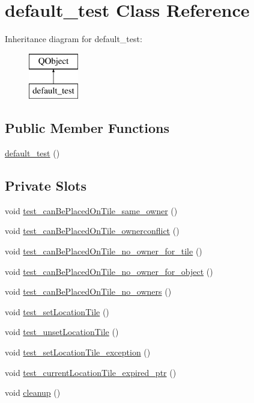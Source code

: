 \hypertarget{classdefault__test}{\section{default\-\_\-test Class Reference}
\label{classdefault__test}
}
Inheritance diagram for default\-\_\-test\-:\begin{figure}[H]
\begin{center}
\leavevmode
\includegraphics[height=2.000000cm]{classdefault__test}
\end{center}
\end{figure}
\subsection*{Public Member Functions}
\begin{DoxyCompactItemize}
\item 
\hyperlink{classdefault__test_adc43e1333543986f2b1cea153e55e64e}{default\-\_\-test} ()
\end{DoxyCompactItemize}
\subsection*{Private Slots}
\begin{DoxyCompactItemize}
\item 
void \hyperlink{classdefault__test_a4529264e0eb70a16261b0005a28185b8}{test\-\_\-can\-Be\-Placed\-On\-Tile\-\_\-same\-\_\-owner} ()
\item 
void \hyperlink{classdefault__test_a936c70b0c81a6d5e6fb3ffe1e9a49f57}{test\-\_\-can\-Be\-Placed\-On\-Tile\-\_\-ownerconflict} ()
\item 
void \hyperlink{classdefault__test_a9f9d88002d8b2dfd225718c1bce068c7}{test\-\_\-can\-Be\-Placed\-On\-Tile\-\_\-no\-\_\-owner\-\_\-for\-\_\-tile} ()
\item 
void \hyperlink{classdefault__test_a82123bc8fb9c4bb9d082f7d625de5770}{test\-\_\-can\-Be\-Placed\-On\-Tile\-\_\-no\-\_\-owner\-\_\-for\-\_\-object} ()
\item 
void \hyperlink{classdefault__test_a680f90cfb91c58a2008d0f8c29bda1c6}{test\-\_\-can\-Be\-Placed\-On\-Tile\-\_\-no\-\_\-owners} ()
\item 
void \hyperlink{classdefault__test_ace1145c8d8200edbdf7cdcff67c4a114}{test\-\_\-set\-Location\-Tile} ()
\item 
void \hyperlink{classdefault__test_a0efdf82443ef2b7419f77f888f35e09c}{test\-\_\-unset\-Location\-Tile} ()
\item 
void \hyperlink{classdefault__test_a4e54b6d8713f0f5c03f6ef1cd03dde02}{test\-\_\-set\-Location\-Tile\-\_\-exception} ()
\item 
void \hyperlink{classdefault__test_a3f2fef4416a96d8fb12d271a71faef94}{test\-\_\-current\-Location\-Tile\-\_\-expired\-\_\-ptr} ()
\item 
void \hyperlink{classdefault__test_ac584f5849bd5b32d0924f26d3e254b3c}{cleanup} ()
\end{DoxyCompactItemize}
